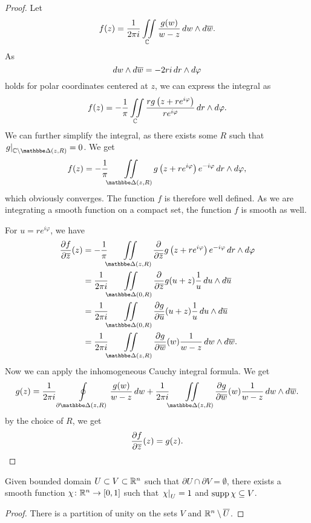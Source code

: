 \begin{proof}
Let
\[
f(z) = \frac{1}{2 \pi i}
\iint\limits_{\mathbb{C}} \frac{g(w)}{w-z}\,dw \wedge d\overline{w}.
\]
As
\[
dw \wedge d\overline{w} = -2ri\,dr \wedge d\varphi
\]
holds for polar coordinates centered at $z$, we can express the
integral as
\[
f(z) = -\frac{1}{\pi}
\iint\limits_{\mathbb{C}} \frac{r g \left(z + r e^{i \varphi}\right)}{r e^{i \varphi}}\,
dr \wedge d\varphi.
\]
We can further simplify the integral, as there exists some $R$
such that $\eval{g}{\C \setminus \dsk(z, R)}{} = 0$. We get
\[
f(z) = -\frac{1}{\pi} \liint_{\dsk(z, R)}
g \br{z + r e^{i \varphi}} e^{-i \varphi}\,dr \wedge d\varphi,
\]
which obviously converges. The function $f$ is therefore well
defined. As we are integrating a smooth function on a compact set,
the function $f$ is smooth as well.

For $u = r e^{i \varphi}$, we have
\begin{align*}
\parc{f}{\oline{z}}(z) &=
-\frac{1}{\pi} \liint_{\dsk(z, R)} \parc{}{\oline{z}}
g \br{z + r e^{i \varphi}} e^{-i \varphi}\,dr \wedge d\varphi
\\
&=
\frac{1}{2 \pi i} \liint_{\dsk(0, R)} \parc{}{\oline{z}}
g(u + z) \frac{1}{u}\,du \wedge d\oline{u}
\\
&=
\frac{1}{2 \pi i} \liint_{\dsk(0, R)}
\parc{g}{\oline{u}}(u+z) \frac{1}{u}\,du \wedge d\oline{u}
\\
&=
\frac{1}{2 \pi i} \liint_{\dsk(z, R)}
\parc{g}{\oline{w}}(w) \frac{1}{w - z}\,dw \wedge d\oline{w}.
\end{align*}
Now we can apply the inhomogeneous Cauchy integral formula. We get
\[
g(z) = \frac{1}{2 \pi i} \olint_{\partial \dsk(z, R)}
\frac{g(w)}{w - z}\,dw + \frac{1}{2 \pi i} \liint_{\dsk(z, R)}
\parc{g}{\oline{w}}(w) \frac{1}{w - z}\,dw \wedge d\oline{w}.
\]
by the choice of $R$, we get
\[
\frac{\partial f}{\partial \overline{z}}(z) = g(z). \qedhere
\]
\end{proof}

\begin{lema}
Given bounded domain $U \subset V \subset \mathbb{R}^n$ such that
$\partial U \cap \partial V = \emptyset$, there exists a smooth
function $\chi \colon \mathbb{R}^n \to [0, 1]$ such that
$\left. \chi\right|_{U}^{} = 1$ and $\operatorname{supp} \chi \subseteq V$.
\end{lema}

\begin{proof}
There is a partition of unity on the sets $V$ and
$\mathbb{R}^n \setminus \overline{U}$.
\end{proof}


